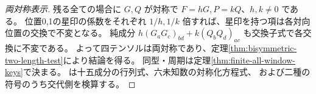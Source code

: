 \begin{proof}[両対称表示]
残る全ての場合に $G,Q$ が対称で $F=hG,P=kQ$、$h,k\ne0$ である。
位置0,1の星印の係数をそれぞれ $1/h,1/k$ 倍すれば、星印を持つ項は各対向位置の交換で不変となる。
純成分 $h(G_aG_c)_{bd}+k(Q_bQ_d)_{ac}$ も交換子式で各交換に不変である。
よって四テンソルは両対称であり、定理\ref{thm:bisymmetric-two-length-test}により結論を得る。
同型・周期は定理\ref{thm:finite-all-window-keys}で決まる。
は十五成分の行列式、六未知数の対称化方程式、
および二種の符号のうち交代側を検算する。
\end{proof}
